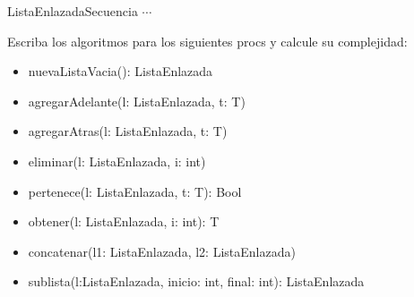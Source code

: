 \documentclass[a4paper,10pt]{article}
\begin{document}
\begin{design}{ListaEnlazada}{Secuencia}
    {\LARGE $\cdots$}
\end{design}
Escriba los algoritmos para los siguientes procs y calcule su complejidad:
\begin{itemize}
    \item nuevaListaVacia(): ListaEnlazada
    \item agregarAdelante(\Inout l: ListaEnlazada, \In t: T)
    \item agregarAtras(\Inout l: ListaEnlazada, \In t: T)
    \item eliminar(\Inout l: ListaEnlazada, \In i: int)
    \item pertenece(\In l: ListaEnlazada, \In t: T): Bool
    \item obtener(\In l: ListaEnlazada, \In i: int): T
    \item concatenar(\Inout l1: ListaEnlazada, \In l2: ListaEnlazada)
    \item sublista(\In l:ListaEnlazada, \In inicio: int, \In final: int): ListaEnlazada
\end{itemize}
\end{document}
